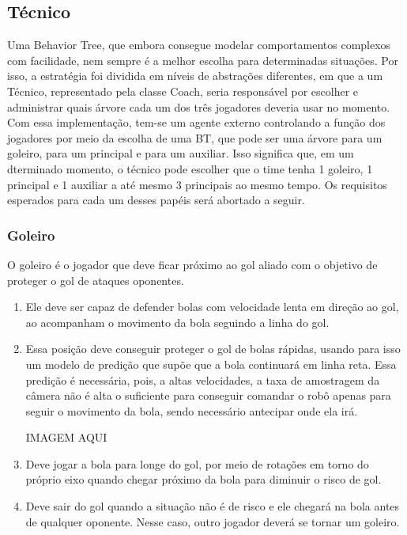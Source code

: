 \documentclass[a4paper,12pt]{article}
\begin{document}
\subsection{Técnico}

Uma Behavior Tree, que embora consegue modelar comportamentos complexos com facilidade, nem sempre é a melhor escolha para determinadas situações. Por isso, a estratégia foi dividida em níveis de abstrações diferentes, em que a um Técnico, representado pela classe Coach, seria responsável por escolher e administrar quais árvore cada um dos três jogadores deveria usar no momento.
Com essa implementação, tem-se um agente externo controlando a função dos jogadores por meio da escolha de uma BT, que pode ser uma árvore para um goleiro, para um principal e para um auxiliar. Isso significa que, em um dterminado momento, o técnico pode escolher que o time tenha 1 goleiro, 1 principal e 1 auxiliar a até mesmo 3 principais ao mesmo tempo. Os requisitos esperados para cada um desses papéis será abortado a seguir.

\subsubsection{Goleiro} 

O goleiro é o jogador que deve ficar próximo ao gol aliado com o objetivo de proteger o gol de ataques oponentes. 
\begin{enumerate}
\item Ele deve ser capaz de defender bolas com velocidade lenta em direção ao gol, ao acompanham o movimento da bola seguindo a linha do gol. 
\item Essa posição deve conseguir proteger o gol de bolas rápidas, usando para isso um modelo de predição que supõe que a bola continuará em linha reta. Essa predição é necessária, pois, a altas velocidades, a taxa de amostragem da câmera não é alta o suficiente para conseguir comandar o robô apenas para seguir o movimento da bola, sendo necessário antecipar onde ela irá.

IMAGEM AQUI


\item Deve jogar a bola para longe do gol, por meio de rotações em torno do próprio eixo quando chegar próximo da bola para diminuir o risco de gol.
\item Deve sair do gol quando a situação não é de risco e ele chegará na bola antes de qualquer oponente. Nesse caso, outro jogador deverá se tornar um goleiro.
\end{enumerate}
\end{document}
